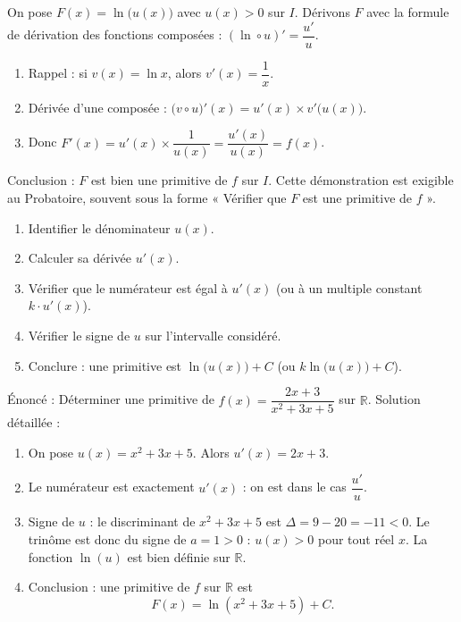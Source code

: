\documentclass[11pt]{article}
\begin{document}
\begin{experience}
On pose $F(x) = \ln\big(u(x)\big)$ avec $u(x) > 0$ sur $I$. Dérivons $F$ avec la formule de dérivation des fonctions composées : $(\ln \circ u)' = \dfrac{u'}{u}$.
\begin{enumerate}
\item Rappel : si $v(x) = \ln x$, alors $v'(x) = \dfrac{1}{x}$.
\item Dérivée d'une composée : $\big(v \circ u\big)'(x) = u'(x) \times v'\big(u(x)\big)$.
\item Donc $F'(x) = u'(x) \times \dfrac{1}{u(x)} = \dfrac{u'(x)}{u(x)} = f(x)$.
\end{enumerate}
Conclusion : $F$ est bien une primitive de $f$ sur $I$. Cette démonstration est exigible au Probatoire, souvent sous la forme « Vérifier que $F$ est une primitive de $f$ ».
\end{experience}

\begin{methode}
\begin{enumerate}
\item Identifier le dénominateur $u(x)$.
\item Calculer sa dérivée $u'(x)$.
\item Vérifier que le numérateur est égal à $u'(x)$ (ou à un multiple constant $k \cdot u'(x)$).
\item Vérifier le signe de $u$ sur l'intervalle considéré.
\item Conclure : une primitive est $\ln\big(u(x)\big) + C$ (ou $k\ln\big(u(x)\big) + C$).
\end{enumerate}
\end{methode}

\begin{exoresolu}
Énoncé : Déterminer une primitive de $f(x) = \dfrac{2x+3}{x^2+3x+5}$ sur $\mathbb{R}$.
\tcblower
Solution détaillée :
\begin{enumerate}
\item On pose $u(x) = x^2+3x+5$. Alors $u'(x) = 2x+3$.
\item Le numérateur est exactement $u'(x)$ : on est dans le cas $\dfrac{u'}{u}$.
\item Signe de $u$ : le discriminant de $x^2+3x+5$ est $\Delta = 9 - 20 = -11 < 0$. Le trinôme est donc du signe de $a=1>0$ : $u(x) > 0$ pour tout réel $x$. La fonction $\ln(u)$ est bien définie sur $\mathbb{R}$.
\item Conclusion : une primitive de $f$ sur $\mathbb{R}$ est
\[
F(x) = \ln(x^2+3x+5) + C.
\]
\end{enumerate}
\end{exoresolu}
\end{document}
